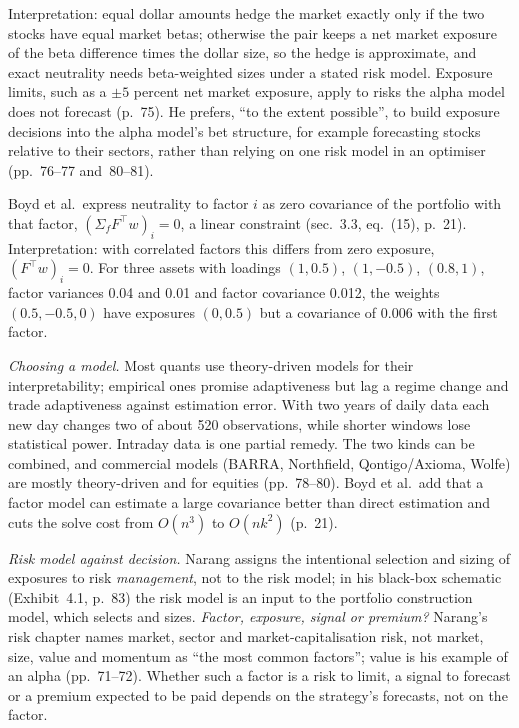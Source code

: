 \begin{qfmodel}
Interpretation: equal dollar amounts hedge the market exactly only if the two stocks have equal market betas; otherwise the pair keeps a net market exposure of the beta difference times the dollar size, so the hedge is approximate, and exact neutrality needs beta-weighted sizes under a stated risk model. Exposure limits, such as a $\pm5$ percent net market exposure, apply to risks the alpha model does not forecast (p.~75). He prefers, ``to the extent possible'', to build exposure decisions into the alpha model's bet structure, for example forecasting stocks relative to their sectors, rather than relying on one risk model in an optimiser (pp.~76--77 and~80--81).

Boyd et al.\ express neutrality to factor $i$ as zero covariance of the portfolio with that factor, $(\Sigma_fF^\top w)_i=0$, a linear constraint (sec.~3.3, eq.~(15), p.~21). Interpretation: with correlated factors this differs from zero exposure, $(F^\top w)_i=0$. For three assets with loadings $(1,0.5)$, $(1,-0.5)$, $(0.8,1)$, factor variances 0.04 and 0.01 and factor covariance 0.012, the weights $(0.5,-0.5,0)$ have exposures $(0,0.5)$ but a covariance of 0.006 with the first factor.

\emph{Choosing a model.} Most quants use theory-driven models for their interpretability; empirical ones promise adaptiveness but lag a regime change and trade adaptiveness against estimation error. With two years of daily data each new day changes two of about 520 observations, while shorter windows lose statistical power. Intraday data is one partial remedy. The two kinds can be combined, and commercial models (BARRA, Northfield, Qontigo/Axioma, Wolfe) are mostly theory-driven and for equities (pp.~78--80). Boyd et al.\ add that a factor model can estimate a large covariance better than direct estimation and cuts the solve cost from $O(n^3)$ to $O(nk^2)$ (p.~21).

 \emph{Risk model against decision.} Narang assigns the intentional selection and sizing of exposures to risk \emph{management}, not to the risk model; in his black-box schematic (Exhibit~4.1, p.~83) the risk model is an input to the portfolio construction model, which selects and sizes. \emph{Factor, exposure, signal or premium?} Narang's risk chapter names market, sector and market-capitalisation risk, not market, size, value and momentum as ``the most common factors''; value is his example of an alpha (pp.~71--72). Whether such a factor is a risk to limit, a signal to forecast or a premium expected to be paid depends on the strategy's forecasts, not on the factor.


\end{qfmodel}
